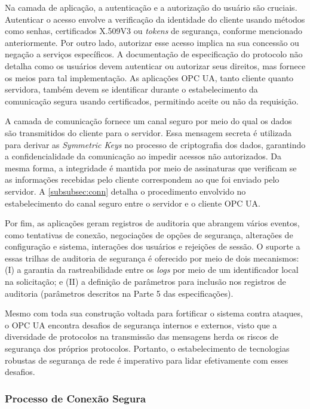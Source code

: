         Na camada de aplicação, a autenticação e a autorização do usuário são cruciais. Autenticar o acesso envolve a verificação da identidade do cliente usando métodos como senhas, certificados X.509V3 ou \textit{tokens} de segurança, conforme mencionado anteriormente. Por outro lado, autorizar esse acesso implica na sua concessão ou negação a serviços específicos. A documentação de especificação do protocolo não detalha como os usuários devem autenticar ou autorizar seus direitos, mas fornece os meios para tal implementação. As aplicações OPC UA, tanto cliente quanto servidora, também devem se identificar durante o estabelecimento da comunicação segura usando certificados, permitindo aceite ou não da requisição.
        
        A camada de comunicação fornece um canal seguro por meio do qual os dados são transmitidos do cliente para o servidor. Essa mensagem secreta é utilizada para derivar as \textit{Symmetric Keys} no processo de criptografia dos dados, garantindo a confidencialidade da comunicação ao impedir acessos não autorizados. Da mesma forma, a integridade é mantida por meio de assinaturas que verificam se as informações recebidas pelo cliente correspondem ao que foi enviado pelo servidor. A \autoref{subsubsec:conn} detalha o procedimento envolvido no estabelecimento do canal seguro entre o servidor e o cliente OPC UA.
        
        Por fim, as aplicações geram registros de auditoria que abrangem vários eventos, como tentativas de conexão, negociações de opções de segurança, alterações de configuração e sistema, interações dos usuários e rejeições de sessão. O suporte a essas trilhas de auditoria de segurança é oferecido por meio de dois mecanismos: (I) a garantia da rastreabilidade entre os \textit{logs} por meio de um identificador local na solicitação; e (II) a definição de parâmetros para inclusão nos registros de auditoria (parâmetros descritos na Parte 5 das especificações).
        
        Mesmo com toda sua construção voltada para fortificar o sistema contra ataques, o OPC UA encontra desafios de segurança internos e externos, visto que a diversidade de protocolos na transmissão das mensagens herda os riscos de segurança dos próprios protocolos. Portanto, o estabelecimento de tecnologias robustas de segurança de rede é imperativo para lidar efetivamente com esses desafios.

    \subsubsection{Processo de Conexão Segura} \label{subsubsec:conn}

